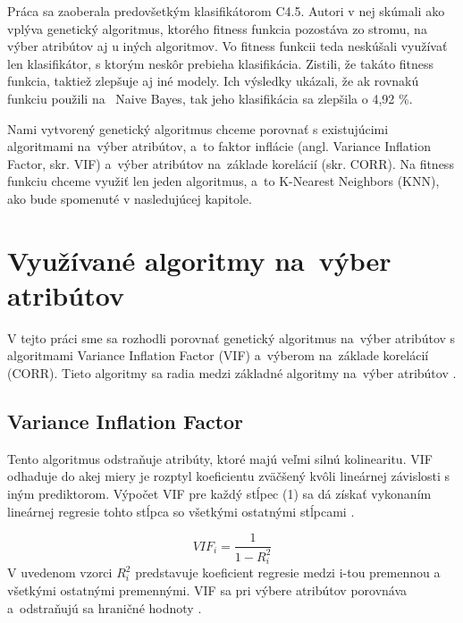 \documentclass[runningheads]{llncs}
\begin{document}
Práca \cite{ref_smith} sa zaoberala predovšetkým klasifikátorom C4.5.
Autori v nej skúmali ako vplýva genetický algoritmus, ktorého fitness funkcia pozostáva zo stromu, 
na výber atribútov aj u iných algoritmov. Vo fitness funkcii teda neskúšali využívať len
klasifikátor, s ktorým neskôr prebieha klasifikácia. Zistili, že takáto fitness funkcia,
taktiež zlepšuje aj iné modely. Ich výsledky ukázali, že ak rovnakú funkciu použili na~
Naive Bayes, tak jeho klasifikácia sa zlepšila o 4,92 \%.

Nami vytvorený genetický algoritmus chceme porovnať s existujúcimi algoritmami na~výber 
atribútov, a~to faktor inflácie (angl. Variance Inflation Factor, skr. VIF) a~výber atribútov na~základe korelácií (skr. CORR).  
Na fitness funkciu chceme využiť len jeden algoritmus, a~to K-Nearest Neighbors (KNN), ako bude spomenuté v nasledujúcej kapitole.


\section{Využívané algoritmy na~výber atribútov}
V tejto práci sme sa rozhodli porovnať genetický algoritmus na~výber atribútov s
algoritmami Variance Inflation Factor (VIF) a~výberom na~základe korelácií (CORR). Tieto 
algoritmy sa radia medzi základné algoritmy na~výber atribútov \cite{ref_xu}.
\subsection{Variance Inflation Factor}
Tento algoritmus odstraňuje atribúty, ktoré majú veľmi silnú kolinearitu.
VIF odhaduje do akej miery je rozptyl koeficientu zväčšený kvôli lineárnej závislosti
s iným prediktorom. Výpočet VIF pre každý stĺpec (1) sa dá získať vykonaním lineárnej 
regresie tohto stĺpca so všetkými ostatnými stĺpcami \cite{ref_xu}.

\begin{equation}
VIF_{i}=\frac{1}{1-R_{i}^{2}}
\end{equation}    
V uvedenom vzorci \begin{math}R_i^2\end{math} predstavuje koeficient regresie medzi i-tou premennou a~
všetkými ostatnými premennými. VIF sa pri výbere atribútov porovnáva a~odstraňujú sa hraničné hodnoty \cite{ref_xu}.
\end{document}
